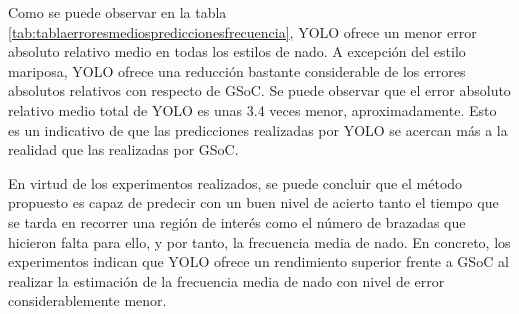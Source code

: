 Como se puede observar en la tabla \ref{tab:tablaerroresmediosprediccionesfrecuencia}, YOLO ofrece un menor error absoluto relativo medio en todas los estilos de nado. A excepción del estilo mariposa, YOLO ofrece una reducción bastante considerable de los errores absolutos relativos con respecto de GSoC. Se puede observar que el error absoluto relativo medio total de YOLO es unas 3.4 veces menor, aproximadamente. Esto es un indicativo de que las predicciones realizadas por YOLO se acercan más a la realidad que las realizadas por GSoC.

En virtud de los experimentos realizados, se puede concluir que el método propuesto es capaz de predecir con un buen nivel de acierto tanto el tiempo que se tarda en recorrer una región de interés como el número de brazadas que hicieron falta para ello, y por tanto, la frecuencia media de nado. En concreto, los experimentos indican que YOLO ofrece un rendimiento superior frente a GSoC al realizar la estimación de la frecuencia media de nado con nivel de error considerablemente menor.
